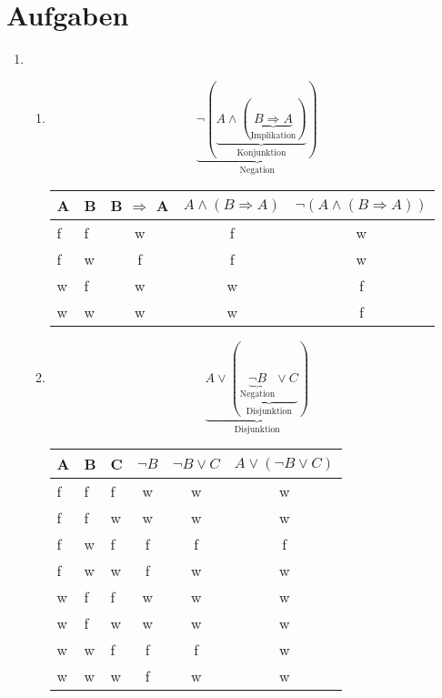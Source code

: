 \documentclass[a4paper]{article}
\begin{document}
	\section{Aufgaben}
	
	\begin{enumerate}
		\item
		\begin{enumerate}
			\item
			\begin{equation*}
				\underbrace{\lnot (\underbrace{A \land (\underbrace{B \Rightarrow A}_{\text{Implikation}})}_{\text{Konjunktion}})}_{\text{Negation}}
			\end{equation*}
			\begin{tabular}{|l|l|c|c|c|}
				\firsthline
					A & B & B $\Rightarrow$ A & $A \land (B \Rightarrow A)$ & $\lnot (A \land (B \Rightarrow A))$ \\
				\hline
					f & f & w & f & w \\
					f & w & f & f & w \\
					w & f & w & w & f \\
					w & w & w & w & f \\
				\hline
			\end{tabular}
			
			\item
			\begin{equation*}
				\underbrace{A \lor (\underbrace{\underbrace{\lnot B}_{\text{Negation}} \lor C}_{\text{Disjunktion}})}_{\text{Disjunktion}}
			\end{equation*}
			\begin{tabular}{|l|l|l|c|c|c|}
				\firsthline
					A & B & C & $\lnot B$ & $\lnot B \lor C$ & $A \lor (\lnot B \lor C)$ \\
				\hline
					f & f & f & w & w & w \\
					f & f & w & w & w & w \\
					f & w & f & f & f & f \\
					f & w & w & f & w & w \\
					w & f & f & w & w & w \\
					w & f & w & w & w & w \\
					w & w & f & f & f & w \\
					w & w & w & f & w & w \\
				\hline
			\end{tabular}
			

\end{enumerate}
\end{enumerate}
\end{document}
